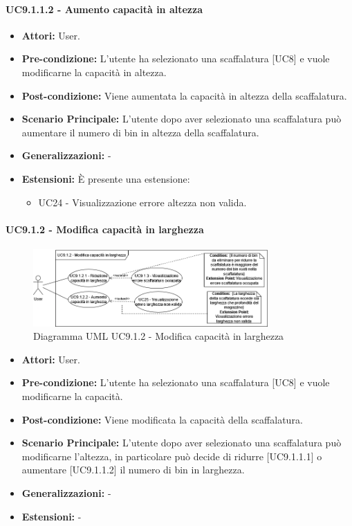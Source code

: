 \paragraph{UC9.1.1.2 - Aumento capacità in altezza}
\begin{itemize}
    \item \textbf{Attori:} User.
    \item \textbf{Pre-condizione:} L'utente ha selezionato una scaffalatura [UC8] e vuole modificarne la capacità in altezza.
    \item \textbf{Post-condizione:} Viene aumentata la capacità in altezza della scaffalatura.
    \item \textbf{Scenario Principale:} L'utente dopo aver selezionato una scaffalatura può aumentare il numero di bin in altezza della scaffalatura.
    \item \textbf{Generalizzazioni:} -
    \item \textbf{Estensioni:} È presente una estensione:
    \begin{itemize}
        \item UC24 - Visualizzazione errore altezza non valida.
    \end{itemize}
\end{itemize}


\paragraph{UC9.1.2 - Modifica capacità in larghezza}
\begin{figure}[H]
  \centering
  \includegraphics[width=0.8\textwidth]{UC_diagrams_1-10/UC9.1.2.drawio.png}
   \caption{Diagramma UML UC9.1.2 - Modifica capacità in larghezza}
\end{figure}
\begin{itemize}
    \item \textbf{Attori:} User.
    \item \textbf{Pre-condizione:} L'utente ha selezionato una scaffalatura [UC8] e vuole modificarne la capacità.
    \item \textbf{Post-condizione:} Viene modificata la capacità della scaffalatura.
    \item \textbf{Scenario Principale:} L'utente dopo aver selezionato una scaffalatura può modificarne l'altezza, in particolare può decide di ridurre [UC9.1.1.1] o aumentare [UC9.1.1.2] il numero di bin in larghezza.
    \item \textbf{Generalizzazioni:} -
    \item \textbf{Estensioni:} -
\end{itemize}


